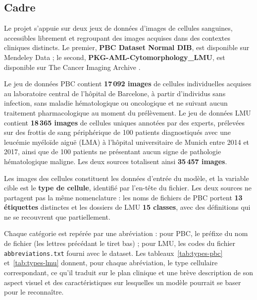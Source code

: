 \subsection{Cadre}

Le projet s’appuie sur deux jeux de données d’images de cellules sanguines, accessibles librement et regroupant des images acquises dans des contextes cliniques distincts.
Le premier, \textbf{PBC Dataset Normal DIB}, est disponible sur Mendeley Data \parencite{acevedo2020mendeley,acevedo2020dib} ; le second, \textbf{PKG-AML-Cytomorphology\_LMU}, est disponible sur The Cancer Imaging Archive \parencite{matek2019tcia,matek2019nmi}.

Le jeu de données PBC contient \textbf{17\,092 images} de cellules individuelles acquises au laboratoire central de l’hôpital de Barcelone, à partir d’individus sans infection, sans maladie hématologique ou oncologique et ne suivant aucun traitement pharmacologique au moment du prélèvement.
Le jeu de données LMU contient \textbf{18\,365 images} de cellules uniques annotées par des experts, prélevées sur des frottis de sang périphérique de 100 patients diagnostiqués avec une leucémie myéloïde aiguë (LMA) à l’hôpital universitaire de Munich entre 2014 et 2017, ainsi que de 100 patients ne présentant aucun signe de pathologie hématologique maligne.
Les deux sources totalisent ainsi \textbf{35\,457 images}.

Les images des cellules constituent les données d’entrée du modèle, et la variable cible est le \textbf{type de cellule}, identifié par l’en-tête du fichier.
Les deux sources ne partagent pas la même nomenclature : les noms de fichiers de PBC portent \textbf{13 étiquettes} distinctes et les dossiers de LMU \textbf{15 classes}, avec des définitions qui ne se recouvrent que partiellement.

Chaque catégorie est repérée par une abréviation : pour PBC, le préfixe du nom de fichier (les lettres précédant le tiret bas) ; pour LMU, les codes du fichier \texttt{abbreviations.txt} fourni avec le dataset.
Les tableaux~\ref{tab:types-pbc} et~\ref{tab:types-lmu} donnent, pour chaque abréviation, le type cellulaire correspondant, ce qu’il traduit sur le plan clinique et une brève description de son aspect visuel et des caractéristiques sur lesquelles un modèle pourrait se baser pour le reconnaître.

\begingroup
\small
\setlength{\tabcolsep}{4pt}
\renewcommand{\arraystretch}{1.15}

